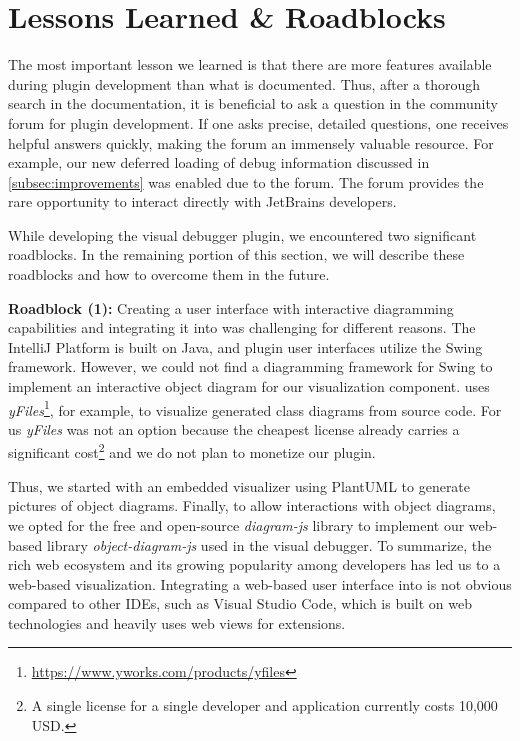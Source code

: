 \documentclass[sigconf]{acmart}
\begin{document}
\section{Lessons Learned \& Roadblocks} \label{sec:lessonsLearned}
The most important lesson we learned is that there are more features available during plugin development than what is documented.
Thus, after a thorough search in the documentation, it is beneficial to ask a question in the community forum for plugin development.
If one asks precise, detailed questions, one receives helpful answers quickly, making the forum an immensely valuable resource.
For example, our new deferred loading of debug information discussed in \autoref{subsec:improvements} was enabled due to the \intellij{} forum.
The forum provides the rare opportunity to interact directly with JetBrains developers.

While developing the visual debugger plugin, we encountered two significant roadblocks.
In the remaining portion of this section, we will describe these roadblocks and how to overcome them in the future.

\textbf{Roadblock (1):} Creating a user interface with interactive diagramming capabilities and integrating it into \intellij{} was challenging for different reasons.
The IntelliJ Platform is built on Java, and plugin user interfaces utilize the Swing framework.
However, we could not find a diagramming framework for Swing to implement an interactive object diagram for our visualization component.
\intellij{} uses \textit{yFiles}\footnote{\url{https://www.yworks.com/products/yfiles}}, for example, to visualize generated class diagrams from source code.
For us \textit{yFiles} was not an option because the cheapest license already carries a significant cost\footnote{A single license for a single developer and application currently costs 10,000 USD.} and we do not plan to monetize our plugin.

Thus, we started with an embedded visualizer using PlantUML \cite{arnaudroquesPlantUML2023} to generate pictures of object diagrams.
Finally, to allow interactions with object diagrams, we opted for the free and open-source \textit{diagram-js} library to implement our web-based library \textit{object-diagram-js} \cite{timkrauterObjectdiagramjs2023} used in the visual debugger.
To summarize, the rich web ecosystem and its growing popularity among developers has led us to a web-based visualization.
Integrating a web-based user interface into \intellij{} is not obvious compared to other IDEs, such as Visual Studio Code, which is built on web technologies and heavily uses web views for extensions.
\end{document}
